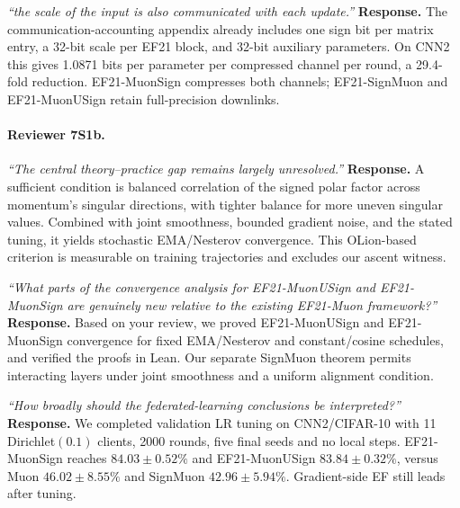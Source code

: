 \noindent\emph{``the scale of the input is also communicated with each update.''}
\textbf{Response.} The communication-accounting appendix already includes one sign bit per matrix entry, a 32-bit scale per EF21 block, and 32-bit auxiliary parameters. On CNN2 this gives 1.0871 bits per parameter per compressed channel per round, a 29.4-fold reduction. EF21-MuonSign compresses both channels; EF21-SignMuon and EF21-MuonUSign retain full-precision downlinks.

\paragraph{Reviewer 7S1b.}
\noindent\emph{``The central theory--practice gap remains largely unresolved.''}
\textbf{Response.} A sufficient condition is balanced correlation of the signed polar factor across momentum's singular directions, with tighter balance for more uneven singular values. Combined with joint smoothness, bounded gradient noise, and the stated tuning, it yields stochastic EMA/Nesterov convergence. This OLion-based criterion is measurable on training trajectories and excludes our ascent witness.

\noindent\emph{``What parts of the convergence analysis for EF21-MuonUSign and EF21-MuonSign are genuinely new relative to the existing EF21-Muon framework?''}
\textbf{Response.} Based on your review, we proved EF21-MuonUSign and EF21-MuonSign convergence for fixed EMA/Nesterov and constant/cosine schedules, and verified the proofs in Lean. Our separate SignMuon theorem permits interacting layers under joint smoothness and a uniform alignment condition.

\noindent\emph{``How broadly should the federated-learning conclusions be interpreted?''}
\textbf{Response.} We completed validation LR tuning on CNN2/CIFAR-10 with 11 Dirichlet$(0.1)$ clients, 2000 rounds, five final seeds and no local steps. EF21-MuonSign reaches $84.03\pm0.52\%$ and EF21-MuonUSign $83.84\pm0.32\%$, versus Muon $46.02\pm8.55\%$ and SignMuon $42.96\pm5.94\%$. Gradient-side EF still leads after tuning.
